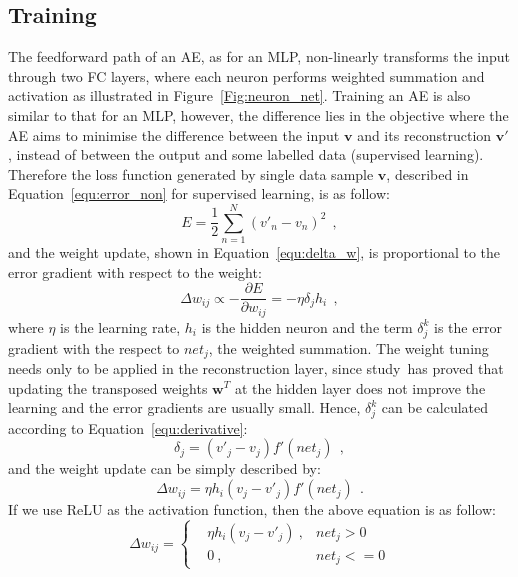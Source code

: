 \subsection{Training}
The feedforward path of an AE, as for an MLP, non-linearly transforms the input through two FC layers, where each neuron performs weighted summation and activation as illustrated in Figure~\ref{Fig:neuron_net}.
Training an AE is also similar to that for an MLP, however, the difference lies in the objective where the AE aims to minimise the difference between the input $\mathbf{v}$ and its reconstruction $\mathbf{v'}$, instead of between the output and some labelled data (supervised learning).
Therefore the loss function generated by \DIFaddbegin {}\DIFaddend single data sample $\mathbf{v}$, described in Equation~\ref{equ:error_non} for supervised learning, is as follow:
\begin{equation}
E = \frac{1}{2}\sum_{n=1}^N (v'_{n}-v_{n})^{2}~~,
\end{equation}
and the weight update, shown in Equation~\ref{equ:delta_w}, is proportional to the error gradient with respect to the weight:
\begin{equation}
\Delta w_{ij} \propto -\frac{\partial E}{\partial w_{ij}} = -\eta \delta_j h_i~~,
\end{equation}
where $\eta$ is the learning rate, $h_i$ is the hidden neuron and the term $\delta^k_j$ is the error gradient with the respect to $net_j$, the weighted summation.
The weight tuning needs only to be applied in the reconstruction layer, since study~\DIFdelbegin {}\DIFdelend \DIFaddbegin {}\DIFaddend has proved that updating the transposed weights $\mathbf{w}^T$ at the hidden layer does not improve the learning and the error gradients are usually small.
Hence, $\delta^k_j$  can be calculated according to Equation~\ref{equ:derivative}:
\begin{equation}
\delta_j = (v'_{j}-v_{j}) f'(net_j)~~,
\end{equation}
and the weight update can be simply described by:
\begin{equation}
\Delta w_{ij} = \eta h_i (v_{j}-v'_{j})  f'(net_j)~~.
\end{equation}
If we use ReLU as the activation function, then the above equation is as follow:
\begin{equation}
\label{equ:ae_widrow_hoff}
\Delta w_{ij} = \left \{
\begin{aligned}
& \eta h_i(v_j - v'_j)~, & net_j > 0 \\
& 0~, & net_j < = 0
\end{aligned} 
\right.
\end{equation}

